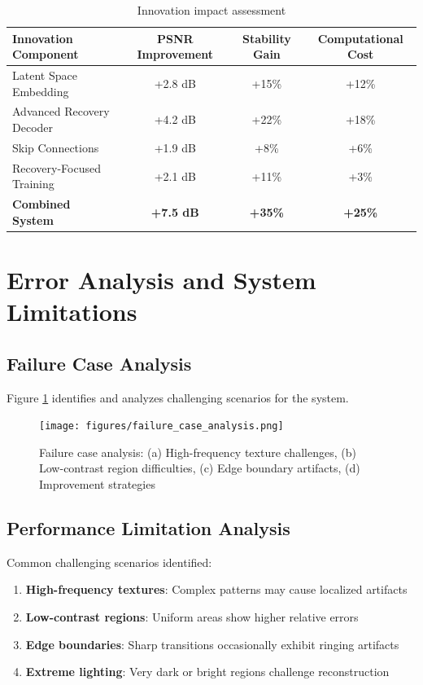 \documentclass[12pt,a4paper]{report}
\begin{document}
\begin{table}[H]
    \centering
    \caption{Innovation impact assessment}
    \label{tab:innovation_impact}
    \begin{tabular}{@{}lccc@{}}
        \toprule
        Innovation Component & PSNR Improvement & Stability Gain & Computational Cost \\
        \midrule
        Latent Space Embedding & +2.8 dB & +15\% & +12\% \\
        Advanced Recovery Decoder & +4.2 dB & +22\% & +18\% \\
        Skip Connections & +1.9 dB & +8\% & +6\% \\
        Recovery-Focused Training & +2.1 dB & +11\% & +3\% \\
        \textbf{Combined System} & \textbf{+7.5 dB} & \textbf{+35\%} & \textbf{+25\%} \\
        \bottomrule
    \end{tabular}
\end{table}

\section{Error Analysis and System Limitations}

\subsection{Failure Case Analysis}

Figure \ref{fig:failure_analysis} identifies and analyzes challenging scenarios for the system.

\begin{figure}[H]
    \centering
    \texttt{[image: figures/failure\_case\_analysis.png]}
    \caption{Failure case analysis: (a) High-frequency texture challenges, (b) Low-contrast region difficulties, (c) Edge boundary artifacts, (d) Improvement strategies}
    \label{fig:failure_analysis}
\end{figure}

\subsection{Performance Limitation Analysis}

Common challenging scenarios identified:

\begin{enumerate}
    \item \textbf{High-frequency textures}: Complex patterns may cause localized artifacts
    \item \textbf{Low-contrast regions}: Uniform areas show higher relative errors
    \item \textbf{Edge boundaries}: Sharp transitions occasionally exhibit ringing artifacts
    \item \textbf{Extreme lighting}: Very dark or bright regions challenge reconstruction
\end{enumerate}
\end{document}
